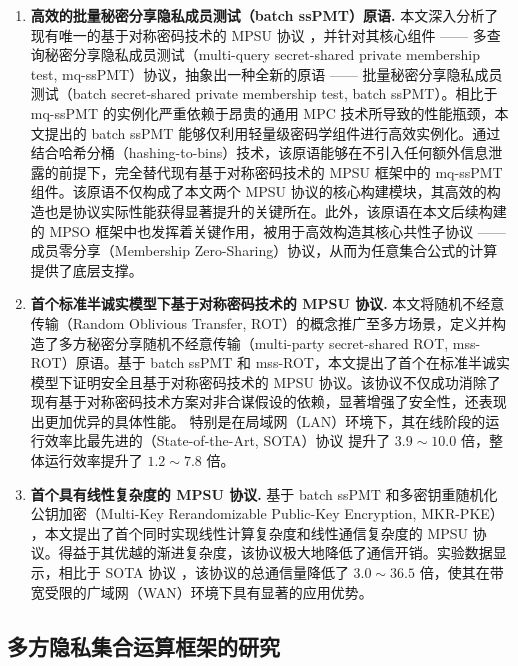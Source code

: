 \begin{enumerate}
	\item \textbf{高效的批量秘密分享隐私成员测试（batch ssPMT）原语.} 
	本文深入分析了现有唯一的基于对称密码技术的 MPSU 协议 \cite{LG-ASIACRYPT-2023}，并针对其核心组件 —— 多查询秘密分享隐私成员测试（multi-query secret-shared private membership test, mq-ssPMT）协议，抽象出一种全新的原语 —— 批量秘密分享隐私成员测试（batch secret-shared private membership test, batch ssPMT）。相比于 mq-ssPMT 的实例化严重依赖于昂贵的通用 MPC 技术所导致的性能瓶颈，本文提出的 batch ssPMT 能够仅利用轻量级密码学组件进行高效实例化。通过结合哈希分桶（hashing-to-bins）技术，该原语能够在不引入任何额外信息泄露的前提下，完全替代现有基于对称密码技术的 MPSU 框架中的 mq-ssPMT 组件。该原语不仅构成了本文两个 MPSU 协议的核心构建模块，其高效的构造也是协议实际性能获得显著提升的关键所在。此外，该原语在本文后续构建的 MPSO 框架中也发挥着关键作用，被用于高效构造其核心共性子协议 —— 成员零分享（Membership Zero-Sharing）协议，从而为任意集合公式的计算提供了底层支撑。

    \item \textbf{首个标准半诚实模型下基于对称密码技术的 MPSU 协议.} 
    本文将随机不经意传输（Random Oblivious Transfer, ROT）的概念推广至多方场景，定义并构造了多方秘密分享随机不经意传输（multi-party secret-shared ROT, mss-ROT）原语。基于 batch ssPMT 和 mss-ROT，本文提出了首个在标准半诚实模型下证明安全且基于对称密码技术的 MPSU 协议。该协议不仅成功消除了现有基于对称密码技术方案对非合谋假设的依赖，显著增强了安全性，还表现出更加优异的具体性能。 特别是在局域网（LAN）环境下，其在线阶段的运行效率比最先进的（State-of-the-Art, SOTA）协议 \cite{LG-ASIACRYPT-2023} 提升了 $3.9 \sim 10.0$ 倍，整体运行效率提升了 $1.2 \sim 7.8$ 倍。

    \item \textbf{首个具有线性复杂度的 MPSU 协议.} 
    基于 batch ssPMT 和多密钥重随机化公钥加密（Multi-Key Rerandomizable Public-Key Encryption, MKR-PKE） \cite{GNT-eprint-2023}，本文提出了首个同时实现线性计算复杂度和线性通信复杂度的 MPSU 协议。得益于其优越的渐进复杂度，该协议极大地降低了通信开销。实验数据显示，相比于 SOTA 协议 \cite{LG-ASIACRYPT-2023}，该协议的总通信量降低了 $3.0 \sim 36.5$ 倍，使其在带宽受限的广域网（WAN）环境下具有显著的应用优势。
\end{enumerate}

\subsection{多方隐私集合运算框架的研究}

